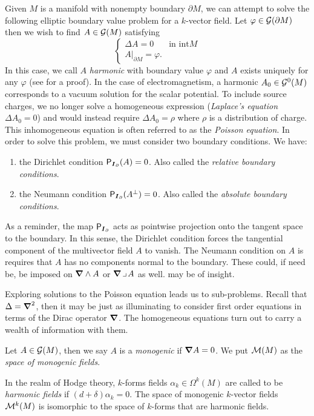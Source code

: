 \documentclass{article}
\begin{document}
Given $M$ is a manifold with nonempty boundary $\partial M$, we can attempt to solve the following elliptic  boundary value problem for a $k$-vector field. Let $\varphi \in \mathcal{G}(\partial M)$ then we wish to find $A \in \mathcal{G}(M)$ satisfying
\begin{equation}
    \label{eq:dirichlet_problem}
    \begin{cases}
    \Delta A = 0 & \textrm{in $\mathrm{int} M$}\\
    A\vert_{\partial M} = \varphi.
    \end{cases}
\end{equation}
In this case, we call $A$ \emph{harmonic} with boundary value $\varphi$ and $A$ exists uniquely for any $\varphi$ (see \cite[Theorem 3.4.6]{schwarz_hodge_1995} for a proof). In the case of electromagnetism, a harmonic $A_0 \in \mathcal{G}^0(M)$ corresponds to a vacuum solution for the scalar potential. To include source charges, we no longer solve a homogeneous expression (\emph{Laplace's equation} $\Delta A_0 = 0$) and would instead require $\Delta A_0 = \rho$ where $\rho$ is a distribution of charge. This inhomogeneous equation is often referred to as the \emph{Poisson equation}. In order to solve this problem, we must consider two boundary conditions. We have:
\begin{enumerate}[1.]
    \item the Dirichlet condition $\mathsf{P}_{\boldsymbol{I}_{\partial}}(A)=0$. Also called the \emph{relative boundary conditions}.
    \item the Neumann condition $\mathsf{P}_{\boldsymbol{I}_\partial}(A^\perp)=0$. Also called the \emph{absolute boundary conditions}.
\end{enumerate}
As a reminder, the map $\mathsf{P}_{\boldsymbol{I}_\partial}$ acts as pointwise projection onto the tangent space to the boundary. In this sense, the Dirichlet condition forces the tangential component of the multivector field $A$ to vanish. The Neumann condition on $A$ is requires that $A$ has no components normal to the boundary. These could, if need be, be imposed on $\boldsymbol{\nabla} \wedge A$ or $\boldsymbol{\nabla} \hspace*{.5mm}\lrcorner \hspace*{.5mm} A$ as well. \cite[Proposition 1.2.6]{schwarz_hodge_1995} may be of insight.

Exploring solutions to the Poisson equation leads us to sub-problems. Recall that $\Delta = \boldsymbol{\nabla}^2$, then it may be just as illuminating to consider first order equations in terms of the Dirac operator $\boldsymbol{\nabla}$. The homogeneous equations turn out to carry a wealth of information with them.
\begin{definition}
Let $A \in \mathcal{G}(M)$, then we say $A$ is a \emph{monogenic} if $\boldsymbol{\nabla} A = 0$. We put $\mathcal{M}(M)$ as the \emph{space of monogenic fields}.
\end{definition}
In the realm of Hodge theory, $k$-forms fields $\alpha_k \in \Omega^k(M)$ are called to be \emph{harmonic fields} if $(d+\delta)\alpha_k = 0$. The space of monogenic $k$-vector fields $\mathcal{M}^k(M)$ is isomorphic to the space of $k$-forms that are harmonic fields. 
\end{document}
